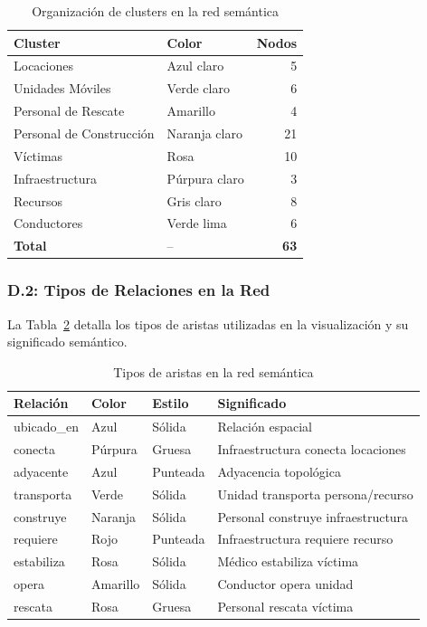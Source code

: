 \documentclass[conference]{IEEEtran}
\begin{document}
    \begin{table}[H]
    \caption{Organización de clusters en la red semántica}
    \label{tab:clusters_red}
    \centering
    \small
    \begin{tabular}{@{}llr@{}}
    \toprule
    \textbf{Cluster} & \textbf{Color} & \textbf{Nodos} \\
    \midrule
    Locaciones & Azul claro & 5 \\
    Unidades Móviles & Verde claro & 6 \\
    Personal de Rescate & Amarillo & 4 \\
    Personal de Construcción & Naranja claro & 21 \\
    Víctimas & Rosa & 10 \\
    Infraestructura & Púrpura claro & 3 \\
    Recursos & Gris claro & 8 \\
    Conductores & Verde lima & 6 \\
    \midrule
    \textbf{Total} & -- & \textbf{63} \\
    \bottomrule
    \end{tabular}
    \end{table}

    \subsubsection*{D.2: Tipos de Relaciones en la Red}

    La Tabla~\ref{tab:relaciones_red} detalla los tipos de aristas utilizadas en la visualización y su significado semántico.

    \begin{table}[H]
    \caption{Tipos de aristas en la red semántica}
    \label{tab:relaciones_red}
    \centering
    \small
    \begin{tabular}{@{}llll@{}}
    \toprule
    \textbf{Relación} & \textbf{Color} & \textbf{Estilo} & \textbf{Significado} \\
    \midrule
    ubicado\_en & Azul & Sólida & Relación espacial \\
    conecta & Púrpura & Gruesa & Infraestructura conecta locaciones \\
    adyacente & Azul & Punteada & Adyacencia topológica \\
    transporta & Verde & Sólida & Unidad transporta persona/recurso \\
    construye & Naranja & Sólida & Personal construye infraestructura \\
    requiere & Rojo & Punteada & Infraestructura requiere recurso \\
    estabiliza & Rosa & Sólida & Médico estabiliza víctima \\
    opera & Amarillo & Sólida & Conductor opera unidad \\
    rescata & Rosa & Gruesa & Personal rescata víctima \\
    \bottomrule
    \end{tabular}
    \end{table}
\end{document}
